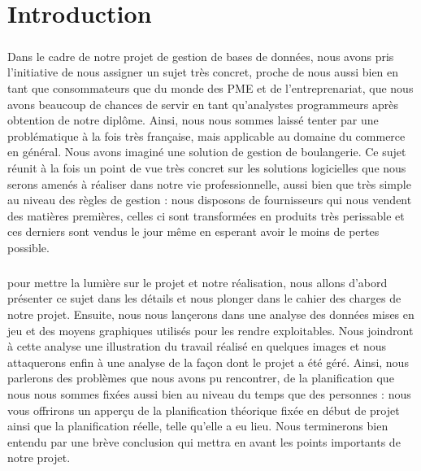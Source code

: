 \chapter*{Introduction}

\paragraph{}
    Dans le cadre de notre projet de gestion de bases de données,
    nous avons pris l'initiative de nous assigner un sujet très concret,
    proche de nous aussi bien en tant que consommateurs que du monde des PME et
    de l'entreprenariat, que nous avons beaucoup de chances de servir en tant
    qu'analystes programmeurs après obtention de notre diplôme.
    Ainsi, nous nous sommes laissé tenter par une problématique à la fois très
    française, mais applicable au domaine du commerce en général.
    Nous avons imaginé une solution de gestion de boulangerie.
    Ce sujet réunit à la fois un point de vue très concret sur les solutions
    logicielles que nous serons amenés à réaliser dans notre vie
    professionnelle, aussi bien que très simple au niveau des règles de
    gestion : nous disposons de fournisseurs qui nous vendent des matières
    premières, celles ci sont transformées en produits très perissable et ces
    derniers sont vendus le jour même en esperant avoir le moins de pertes
    possible.
\paragraph{}
    pour mettre la lumière sur le projet et notre réalisation, nous allons 
    d'abord présenter ce sujet dans les détails et nous plonger dans le cahier
    des charges de notre projet. Ensuite, nous nous lançerons dans une analyse
    des données mises en jeu et des moyens graphiques utilisés pour
    les rendre exploitables.
    Nous joindront à cette analyse une illustration du travail réalisé en
    quelques images et nous attaquerons enfin à une analyse de la façon dont le
    projet a été géré. Ainsi, nous parlerons des problèmes que nous avons pu
    rencontrer, de la planification que nous nous sommes fixées aussi bien au
    niveau du temps que des personnes : nous vous offrirons un apperçu de la 
    planification théorique fixée en début de projet ainsi que la planification
    réelle, telle qu'elle a eu lieu. Nous terminerons bien entendu par une
    brève conclusion qui mettra en avant les points importants de notre projet.
